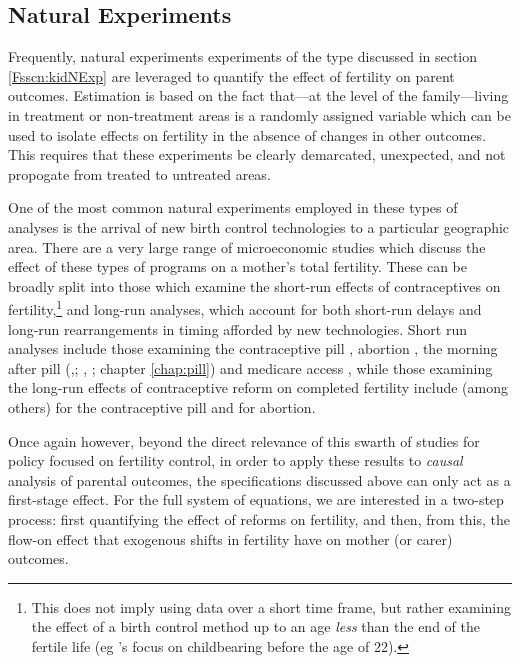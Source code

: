 \subsection{Natural Experiments}
\label{Fsscn:motherNExp}
Frequently, natural experiments experiments of the type discussed in section 
\ref{Fsscn:kidNExp} are leveraged to quantify the effect of fertility on 
parent outcomes.  Estimation is based on the fact that---at the level of the
family---living in treatment or non-treatment areas is a randomly assigned
variable which can be used to isolate effects on fertility in the absence of 
changes in other outcomes.  This requires that these experiments be clearly 
demarcated, unexpected, and not propogate from treated to untreated areas.

One of the most common natural experiments employed in these types of analyses 
is the arrival of new birth control technologies to a particular geographic 
area.  There are a very large range of microeconomic studies which discuss 
the effect of these types of programs on a mother's total fertility.  These can
be broadly split into those which examine the short-run effects of 
contraceptives on fertility,\footnote{This does not imply using data over a 
short time frame, but rather examining the effect of a birth control method up 
to an age \emph{less} than the end of the fertile life (eg \citet{Bailey2006}'s
focus on childbearing before the age of 22).} and long-run analyses, which 
account for both short-run delays and long-run rearrangements in timing 
afforded by new technologies.  Short run analyses include those examining the 
contraceptive pill \citep{Bailey2006,Bailey2009,Christensen2012}, abortion
\citep{Guldi2008,Levineetal1999}, the morning after pill 
(\citeauthor{Grossetal2014},\citeyear{Grossetal2014}; \citeauthor{Durrance2013}, 
\citeyear{Durrance2013}; chapter \ref{chap:pill}) and medicare access 
\citep{KearnerLevine2009}, while those examining the long-run effects of
contraceptive reform on completed fertility include (among others)  
\citet{Bailey2011,Bailey2013,Bailey2012} for the contraceptive pill and 
\citet{AngristEvans1996,OltmansHungerman2012} for abortion.

Once again however, beyond the direct relevance of this swarth of studies for
policy focused on fertility control, in order to apply these results to
\emph{causal} analysis of parental outcomes, the specifications discussed above 
can only act as a first-stage effect.  For the full system of equations, we
are interested in a two-step process: first quantifying the effect of reforms
on fertility, and then, from this, the flow-on effect that exogenous shifts in
fertility have on mother (or carer) outcomes.

